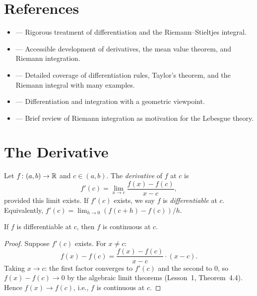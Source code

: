 \documentclass[11pt,a4paper]{article}
\begin{document}
\section{References}
\label{sec:references}

\begin{itemize}
  \item \citet[Chapters 5--6]{rudin1976} --- Rigorous treatment of
    differentiation and the Riemann--Stieltjes integral.
  \item \citet[Chapters 5--7]{abbott2015} --- Accessible development of
    derivatives, the mean value theorem, and Riemann integration.
  \item \citet[Chapters 6--7]{bartle2011} --- Detailed coverage of
    differentiation rules, Taylor's theorem, and the Riemann integral
    with many examples.
  \item \citet[Chapters 5--6]{pugh2015} --- Differentiation and
    integration with a geometric viewpoint.
  \item \citet[Chapter 1]{folland1999} --- Brief review of Riemann
    integration as motivation for the Lebesgue theory.
\end{itemize}

\section{The Derivative}
\label{sec:derivative}

\begin{definition}[Derivative]
\label{def:derivative}
Let $f \colon (a, b) \to \mathbb{R}$ and $c \in (a, b)$. The \emph{derivative}
of $f$ at $c$ is
\[
  f'(c) = \lim_{x \to c} \frac{f(x) - f(c)}{x - c},
\]
provided this limit exists. If $f'(c)$ exists, we say $f$ is
\emph{differentiable} at $c$. Equivalently, $f'(c) = \lim_{h \to 0}
(f(c + h) - f(c))/h$.
\end{definition}

\begin{theorem}
\label{thm:diff_implies_cont}
If $f$ is differentiable at $c$, then $f$ is continuous at $c$.
\end{theorem}

\begin{proof}
Suppose $f'(c)$ exists. For $x \neq c$:
\[
  f(x) - f(c) = \frac{f(x) - f(c)}{x - c} \cdot (x - c).
\]
Taking $x \to c$: the first factor converges to $f'(c)$ and the second
to $0$, so $f(x) - f(c) \to 0$ by the algebraic limit theorems
(Lesson~1, Theorem~4.4). Hence $f(x) \to f(c)$, i.e., $f$ is continuous
at $c$.
\end{proof}
\end{document}
